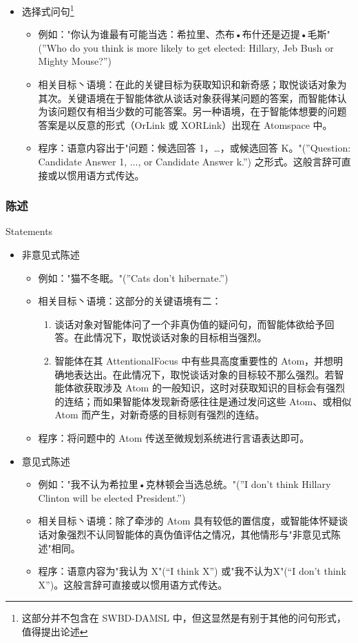 \begin{itemize}
\item 选择式问句\footnote{这部分并不包含在 SWBD-DAMSL 中，但这显然是有别于其他的问句形式，值得提出论述}
\begin{itemize}
\item 例如："你认为谁最有可能当选：希拉里、杰布•布什还是迈提•毛斯"(”Who do you think is more likely to get elected: Hillary, Jeb Bush or Mighty Mouse?”)
\item 相关目标丶语境：在此的关键目标为获取知识和新奇感；取悦谈话对象为其次。关键语境在于智能体欲从谈话对象获得某问题的答案，而智能体认为该问题仅有相当少数的可能答案。另一种语境，在于智能体想要的问题答案是以反意的形式（OrLink 或 XORLink）出现在 Atomspace 中。
\item 程序：语意内容出于"问题：候选回答 1，…，或候选回答 K。"(”Question: Candidate Answer 1, ..., or Candidate Answer k.”) 之形式。这般言辞可直接或以惯用语方式传达。
\end{itemize}


\end{itemize}


\subsubsection{陈述}{Statements}

\begin{itemize}
\item 非意见式陈述
\begin{itemize}
\item 例如："猫不冬眠。"(”Cats don’t hibernate.”)
\item 相关目标丶语境：这部分的关键语境有二：
\begin{enumerate}
\item 谈话对象对智能体问了一个非真伪值的疑问句，而智能体欲给予回答。在此情况下，取悦谈话对象的目标相当强烈。
\item 智能体在其 AttentionalFocus 中有些具高度重要性的 Atom，并想明确地表达出。在此情况下，取悦谈话对象的目标较不那么强烈。若智能体欲获取涉及 Atom 的一般知识，这时对获取知识的目标会有强烈的连结；而如果智能体发现新奇感往往是通过发问这些 Atom、或相似 Atom 而产生，对新奇感的目标则有强烈的连结。
\end{enumerate}
\item 程序：将问题中的 Atom 传送至微规划系统进行言语表达即可。
\end{itemize}


\item 意见式陈述
\begin{itemize}
\item 例如："我不认为希拉里•克林顿会当选总统。"(”I don’t think Hillary Clinton will be elected President.”) 
\item 相关目标丶语境：除了牵涉的 Atom 具有较低的置信度，或智能体怀疑谈话对象强烈不认同智能体的真伪值评估之情况，其他情形与"非意见式陈述"相同。
\item 程序：语意内容为"我认为 X"(“I think X”) 或"我不认为X"(“I don’t think X”)。这般言辞可直接或以惯用语方式传达。
\end{itemize}

\end{itemize}


